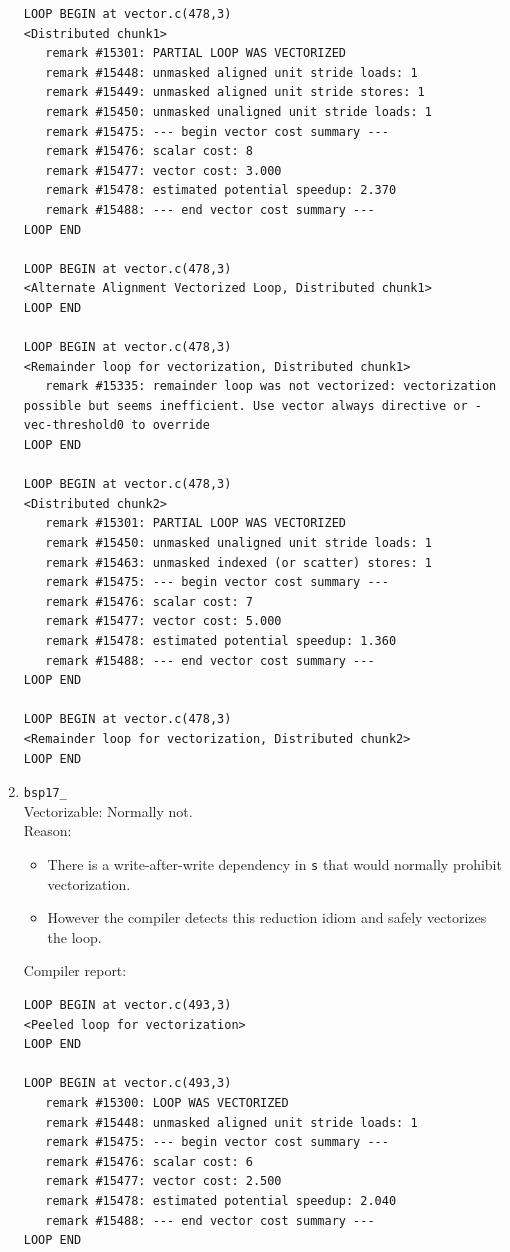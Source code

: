 \documentclass[11pt]{article}
\begin{document}
\begin{enumerate}
\begin{lstlisting}
LOOP BEGIN at vector.c(478,3)
<Distributed chunk1>
   remark #15301: PARTIAL LOOP WAS VECTORIZED
   remark #15448: unmasked aligned unit stride loads: 1 
   remark #15449: unmasked aligned unit stride stores: 1 
   remark #15450: unmasked unaligned unit stride loads: 1 
   remark #15475: --- begin vector cost summary ---
   remark #15476: scalar cost: 8 
   remark #15477: vector cost: 3.000 
   remark #15478: estimated potential speedup: 2.370 
   remark #15488: --- end vector cost summary ---
LOOP END

LOOP BEGIN at vector.c(478,3)
<Alternate Alignment Vectorized Loop, Distributed chunk1>
LOOP END

LOOP BEGIN at vector.c(478,3)
<Remainder loop for vectorization, Distributed chunk1>
   remark #15335: remainder loop was not vectorized: vectorization possible but seems inefficient. Use vector always directive or -vec-threshold0 to override 
LOOP END

LOOP BEGIN at vector.c(478,3)
<Distributed chunk2>
   remark #15301: PARTIAL LOOP WAS VECTORIZED
   remark #15450: unmasked unaligned unit stride loads: 1 
   remark #15463: unmasked indexed (or scatter) stores: 1 
   remark #15475: --- begin vector cost summary ---
   remark #15476: scalar cost: 7 
   remark #15477: vector cost: 5.000 
   remark #15478: estimated potential speedup: 1.360 
   remark #15488: --- end vector cost summary ---
LOOP END

LOOP BEGIN at vector.c(478,3)
<Remainder loop for vectorization, Distributed chunk2>
LOOP END
\end{lstlisting}

\item \texttt{bsp17\_}\\
Vectorizable: Normally not.\\
Reason:
\begin{itemize}
\item There is a write-after-write dependency in \texttt{s} that would normally prohibit vectorization.
\item However the compiler detects this reduction idiom and safely vectorizes the loop.
\end{itemize}
Compiler report:
\begin{lstlisting}
LOOP BEGIN at vector.c(493,3)
<Peeled loop for vectorization>
LOOP END

LOOP BEGIN at vector.c(493,3)
   remark #15300: LOOP WAS VECTORIZED
   remark #15448: unmasked aligned unit stride loads: 1 
   remark #15475: --- begin vector cost summary ---
   remark #15476: scalar cost: 6 
   remark #15477: vector cost: 2.500 
   remark #15478: estimated potential speedup: 2.040 
   remark #15488: --- end vector cost summary ---
LOOP END


\end{lstlisting}
\end{enumerate}
\end{document}

